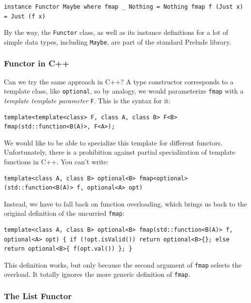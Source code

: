 \begin{verbatim}
instance Functor Maybe where fmap _ Nothing = Nothing fmap f (Just x) = Just (f x)
\end{verbatim}

By the way, the \texttt{Functor} class, as well as its instance
definitions for a lot of simple data types, including \texttt{Maybe},
are part of the standard Prelude library.

\subsubsection{Functor in C++}\label{functor-in-c}

Can we try the same approach in C++? A type constructor corresponds to a
template class, like \texttt{optional}, so by analogy, we would
parameterize \texttt{fmap} with a \emph{template template parameter}
\texttt{F}. This is the syntax for it:

\begin{verbatim}
template<template<class> F, class A, class B> F<B> fmap(std::function<B(A)>, F<A>);
\end{verbatim}

We would like to be able to specialize this template for different
functors. Unfortunately, there is a prohibition against partial
specialization of template functions in C++. You can't write:

\begin{verbatim}
template<class A, class B> optional<B> fmap<optional>(std::function<B(A)> f, optional<A> opt)
\end{verbatim}

Instead, we have to fall back on function overloading, which brings us
back to the original definition of the uncurried \texttt{fmap}:

\begin{verbatim}
template<class A, class B> optional<B> fmap(std::function<B(A)> f, optional<A> opt) { if (!opt.isValid()) return optional<B>{}; else return optional<B>{ f(opt.val()) }; }
\end{verbatim}

This definition works, but only because the second argument of
\texttt{fmap} selects the overload. It totally ignores the more generic
definition of \texttt{fmap}.

\subsubsection{The List Functor}\label{the-list-functor}

